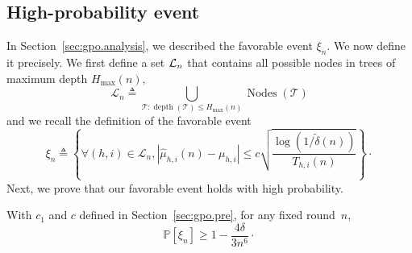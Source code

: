 \subsection{High-probability event}\label{proof:lemma_event}

In Section~\ref{sec:gpo.analysis}, we described the favorable event $\xi_n$.  We now define it precisely. We first define a set $\mathcal{L}_n$ that contains all possible nodes in trees of maximum depth $H_{\max}(n),$
\[
\mathcal{L}_n \triangleq \bigcup\limits_{\mathcal{T}:\operatorname{depth}(\mathcal{T})\leq H_{\max}(n)} \operatorname{Nodes}(\mathcal{T})
\]
and we recall the definition of the favorable event
\[
\xi_n \triangleq \left\{ \forall (h,i)\in\mathcal{L}_n,  |\hat{\mu}_{h,i}(n) - \mu_{h,i}| \leq c\sqrt{\frac{\log(1/\tilde{\delta}(n))}{T_{h,i}(n)}} \right\}\!\cdot\]
Next, we prove that our favorable event holds with high probability.

\begin{lemma} \label{lemma_event}
With $c_1$ and $c$ defined in Section~\ref{sec:gpo.pre}, for any fixed round~$n$,
\[
\mathbb{P}\left[ \xi_n \right] \geq 1-\frac{4\delta}{3n^6}\cdot
\]
\end{lemma}

